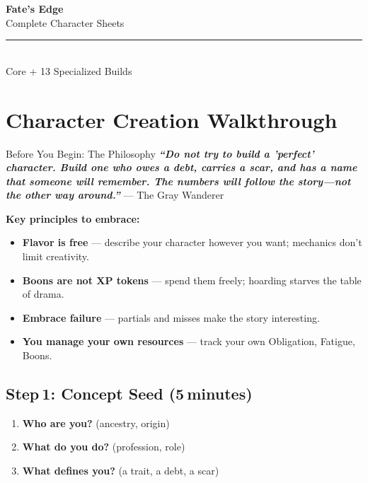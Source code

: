 \documentclass[10pt]{article}
\begin{document}
\thispagestyle{empty}
\begin{center}
    {\Huge\bfseries\sffamily\color{edgered} Fate's Edge}\\[0.3em]
    {\large\sffamily Complete Character Sheets}\\[1em]
    \rule{0.5\textwidth}{0.5pt}\\[1em]
    {\large\sffamily Core + 13 Specialized Builds}\\[2em]
\end{center}
\newpage

\section*{Character Creation Walkthrough}

\begin{tipbox}{Before You Begin: The Philosophy}
    \textbf{\textit{``Do not try to build a 'perfect' character. Build one who owes a debt, carries a scar, and has a name that someone will remember. The numbers will follow the story---not the other way around.''}}
    \hfill --- The Gray Wanderer
    
    \vspace{0.5em}
    \textbf{Key principles to embrace:}
    \begin{itemize}
        \item \textbf{Flavor is free} --- describe your character however you want; mechanics don't limit creativity.
        \item \textbf{Boons are not XP tokens} --- spend them freely; hoarding starves the table of drama.
        \item \textbf{Embrace failure} --- partials and misses make the story interesting.
        \item \textbf{You manage your own resources} --- track your own Obligation, Fatigue, Boons.
    \end{itemize}
\end{tipbox}

\subsection*{Step 1: Concept Seed (5 minutes)}
\begin{enumerate}
    \item \textbf{Who are you?} (ancestry, origin)
    \item \textbf{What do you do?} (profession, role)
    \item \textbf{What defines you?} (a trait, a debt, a scar)
\end{enumerate}
\end{document}
